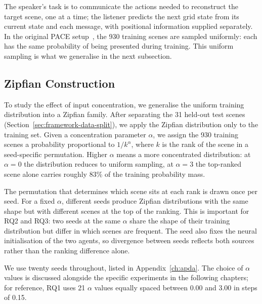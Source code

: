 The speaker's task is to communicate the actions needed to reconstruct the target scene, one at a time; the listener predicts the next grid state from its current state and each message, with positional information supplied separately. In the original PACE setup~\cite{thomas_pace_2025}, the 930 training scenes are sampled uniformly: each has the same probability of being presented during training. This uniform sampling is what we generalise in the next subsection.

\subsection{Zipfian Construction}
\label{sec:framework-zipfian-construction}

To study the effect of input concentration, we generalise the uniform training distribution into a Zipfian family. After separating the 31 held-out test scenes (Section~\ref{sec:framework-data-split}), we apply the Zipfian distribution only to the training set. Given a concentration parameter $\alpha$, we assign the 930 training scenes a probability proportional to $1/k^\alpha$, where $k$ is the rank of the scene in a seed-specific permutation. Higher $\alpha$ means a more concentrated distribution: at $\alpha = 0$ the distribution reduces to uniform sampling, at $\alpha = 3$ the top-ranked scene alone carries roughly 83\% of the training probability mass.

The permutation that determines which scene sits at each rank is drawn once per seed. For a fixed $\alpha$, different seeds produce Zipfian distributions with the same shape but with different scenes at the top of the ranking. This is important for RQ2 and RQ3: two seeds at the same $\alpha$ share the shape of their training distribution but differ in which scenes are frequent. The seed also fixes the neural initialisation of the two agents, so divergence between seeds reflects both sources rather than the ranking difference alone.

We use twenty seeds throughout, listed in Appendix~\ref{ch:apda}. The choice of $\alpha$ values is discussed alongside the specific experiments in the following chapters; for reference, RQ1 uses 21 $\alpha$ values equally spaced between 0.00 and 3.00 in steps of 0.15.

